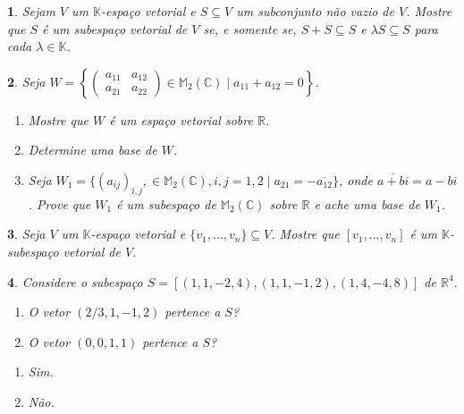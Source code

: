 \documentclass[12pt]{exam}
\newtheorem{exercicio}{}
\newcommand{\sub}{\subseteq}
\newcommand{\real}{\mathbb{R}}
\newcommand{\complex}{\mathbb{C}}
\newcommand{\cp}[1]{\mathbb{#1}}
\begin{document}
\begin{exercicio}
  Sejam $V$ um $\cp{K}$-espa\c{c}o vetorial e $S \sub V $ um subconjunto n\~ao vazio de $V$. Mostre que $S$ \'e um subespa\c{c}o vetorial de $V$ se, e somente se, $S + S \sub S$ e $\lambda S \sub S$ para cada $\lambda \in \cp{K}$.
\end{exercicio}

\begin{exercicio}
  Seja $W = \left\{\begin{pmatrix} a_{11} & a_{12}\\ a_{21} & a_{22}\end{pmatrix} \in \cp{M}_2(\complex) \mid a_{11} + a_{12} = 0\right\}$.
  \begin{enumerate}[label={\alph*})]
    \item Mostre que $W$ \'e um espa\c{c}o vetorial sobre $\real$.
    \item Determine uma base de $W$.
    \item Seja $W_1 = \{(a_{ij})_{i,j}, \in \cp{M}_2(\complex), i, j = 1, 2 \mid a_{21} = -\overline{a_{12}}\}$, onde $\overline{a + bi} = a - bi$. Prove que $W_1$ \'e um subespa\c{c}o de $\cp{M}_2(\complex)$ sobre $\real$ e ache uma base de $W_1$.
  \end{enumerate}
\end{exercicio}

\begin{exercicio}
  Seja $V$ um $\cp{K}$-espa\c{c}o vetorial e $\{v_1,\dots,v_n\} \sub V$. Mostre que $[v_1,\dots,v_n]$ \'e um $\cp{K}$-subespa\c{c}o vetorial de $V$.
\end{exercicio}

\begin{exercicio}
  Considere o subespa\c{c}o $S = [(1,1,-2,4),(1,1,-1,2),(1,4,-4,8)]$ de $\real^4$.
  \begin{enumerate}[label={\alph*})]
    \item O vetor $(2/3, 1, -1, 2)$ pertence a $S$?
    \item O vetor $(0, 0, 1, 1)$ pertence a $S$?
  \end{enumerate}
  \begin{solucao}
    \begin{enumerate}[label={\alph*})]
      \item Sim.
      \item N\~ao.
    \end{enumerate}
  \end{solucao}
\end{exercicio}
\end{document}
